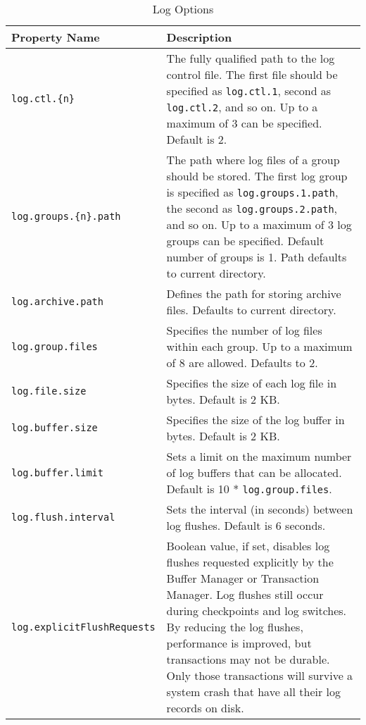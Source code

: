 \documentclass[a4paper,draft,oneside]{book}
\begin{document}
\begin{table}[tbp]
\begin{center}
\begin{tabular}{|l|p{6cm}|}
  \hline
  \textbf{Property Name}&\textbf{Description}  \\
  \hline 
  \verb|log.ctl.{n}|&The fully qualified path to the
  log control file. The first file should be specified as
  \verb|log.ctl.1|, second as \verb|log.ctl.2|, and so on. Up to a
  maximum of 3 can be specified. Default is 2. \\
  \hline
  \verb|log.groups.{n}.path|&The path where log
  files of a group should be stored. The first log group is specified
  as \verb|log.groups.1.path|, the second as \verb|log.groups.2.path|,
  and so on. Up to a maximum of 3 log groups can be specified. Default
  number of groups is 1. Path defaults to current directory.  \\
  \hline
  \verb|log.archive.path|&Defines the path for storing archive files. 
  Defaults to current directory.  \\
  \hline
  \verb|log.group.files|&Specifies the number of log files within each group.
  Up to a maximum of 8 are allowed. Defaults to 2. \\
  \hline 
  \verb|log.file.size|&Specifies the size of each log file in
  bytes. Default is 2 KB. \\
  \hline 
  \verb|log.buffer.size|&Specifies the size of the log buffer
  in bytes. Default is 2 KB. \\
  \hline 
  \verb|log.buffer.limit|&Sets a limit on the maximum number of
  log buffers that can be allocated. Default is 10 *
  \verb|log.group.files|.  \\
  \hline 
  \verb|log.flush.interval|&Sets the interval (in seconds)
  between log flushes. Default is 6 seconds.  \\
  \hline 
  \verb|log.explicitFlushRequests|&Boolean value, if set, disables 
  log flushes requested explicitly by the Buffer Manager or Transaction 
  Manager. Log flushes still occur during checkpoints and log switches. 
  By reducing the log flushes, performance is improved, but transactions 
  may not be durable. Only those transactions will survive a system crash 
  that have all their log records on disk.  \\
  \hline 
\end{tabular}
\end{center}
\caption{Log Options}
\label{tab:logoptions}
\end{table}
\end{document}

